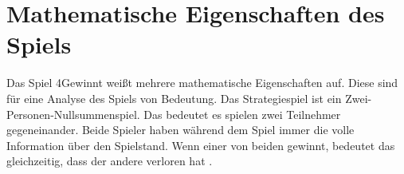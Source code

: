 \section{Mathematische Eigenschaften des Spiels}
%
%	
%

Das Spiel 4Gewinnt weißt mehrere mathematische Eigenschaften auf. Diese sind für eine Analyse des Spiels von Bedeutung. 
Das Strategiespiel ist ein Zwei-Personen-Nullsummenspiel. Das bedeutet es spielen zwei Teilnehmer gegeneinander. Beide Spieler haben während dem Spiel immer die volle Information über den Spielstand. Wenn einer von beiden gewinnt, bedeutet das gleichzeitig, dass der andere verloren hat \autocite{ruile2009viergewinnt}.
 